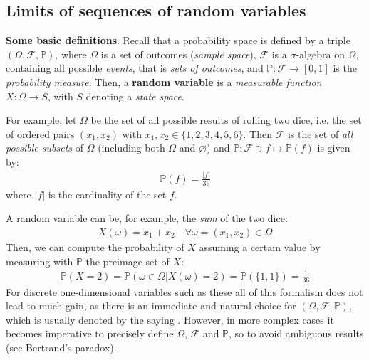 \documentclass[../template.tex]{subfiles}
\begin{document}
\subsection{Limits of sequences of random variables}
\begin{expl}
    \textbf{Some basic definitions}. Recall that a probability space is defined by a triple $(\Omega, \mathcal{F}, \mathbb{P})$, where $\Omega$ is a set of outcomes (\textit{sample space}), $\mathcal{F}$ is a $\sigma$-algebra on $\Omega$, containing all possible \textit{events}, that is \textit{sets of outcomes}, and $\mathbb{P}\colon \mathcal{F} \to [0,1]$ is the \textit{probability measure}. Then, a \textbf{random variable} is a \textit{measurable function}  $X\colon \Omega \to S$, with $S$ denoting a \textit{state space}. 
    
    For example, let $\Omega$ be the set of all possible results of rolling two dice, i.e. the set of ordered pairs $(x_1, x_2)$ with $x_1,x_2 \in \{1,2,3,4,5,6\}$. Then $\mathcal{F}$ is the set of \textit{all possible subsets} of $\Omega$ (including both $\Omega$ and $\varnothing$) and $\mathbb{P}\colon \mathcal{F}\ni f \mapsto \mathbb{P}(f)$ is given by:
    \begin{align*}
        \mathbb{P}(f) = \frac{|f|}{36} 
    \end{align*}
    where $|f|$ is the cardinality of the set $f$. 

    A random variable can be, for example, the \textit{sum} of the two dice:
    \begin{align*}
        X(\omega) = x_1 + x_2 \quad \forall \omega=(x_1, x_2) \in \Omega
    \end{align*} 
    Then, we can compute the probability of $X$ assuming a certain value by measuring with $\mathbb{P}$ the preimage set of $X$:
    \begin{align*}
        \mathbb{P}(X=2) = \mathbb{P}(\omega \in \Omega | X(\omega) = 2) = \mathbb{P}(\{1,1\}) = \frac{1}{36} 
    \end{align*}
    For discrete one-dimensional variables such as these all of this formalism does not lead to much gain, as there is an immediate and natural choice for $(\Omega, \mathcal{F}, \mathbb{P})$, which is usually denoted by the saying . However, in more complex cases it becomes imperative to precisely define $\Omega$, $\mathcal{F}$ and $\mathbb{P}$, so to avoid ambiguous results (see Bertrand's paradox).
\end{expl}
\end{document}
